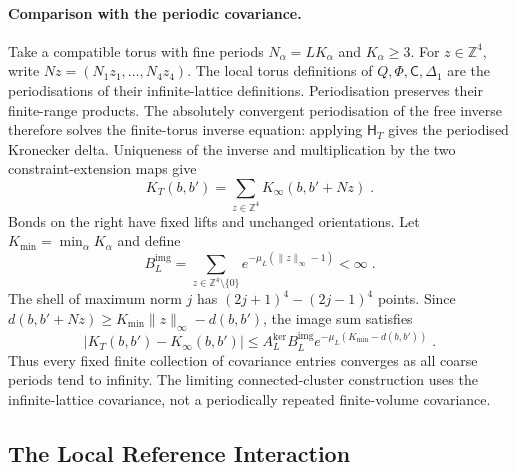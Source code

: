 \documentclass[11pt]{article}
\begin{document}
\paragraph{Comparison with the periodic covariance.}
Take a compatible torus with fine periods $N_\alpha=LK_\alpha$ and $K_\alpha\geq3$. For $z\in\mathbb Z^4$, write $Nz=(N_1z_1,\ldots,N_4z_4)$. The local torus definitions of $Q,\Phi,\mathsf C,\Delta_1$ are the periodisations of their infinite-lattice definitions. Periodisation preserves their finite-range products. The absolutely convergent periodisation of the free inverse therefore solves the finite-torus inverse equation: applying $\mathsf H_T$ gives the periodised Kronecker delta. Uniqueness of the inverse and multiplication by the two constraint-extension maps give
\begin{equation}\label{eq:bulk-periodisation}
    K_T(b,b')=\sum_{z\in\mathbb Z^4}K_\infty(b,b'+Nz)\;.
\end{equation}
Bonds on the right have fixed lifts and unchanged orientations. Let $K_{\min}=\min_\alpha K_\alpha$ and define
\begin{equation}\label{eq:bulk-image-constant}
    B_L^{\mathrm{img}}
        =\sum_{z\in\mathbb Z^4\setminus\{0\}}
            e^{-\mu_L(\|z\|_\infty-1)}<\infty\;.
\end{equation}
The shell of maximum norm $j$ has $(2j+1)^4-(2j-1)^4$ points. Since $d(b,b'+Nz)\geq K_{\min}\|z\|_\infty-d(b,b')$, the image sum satisfies
\begin{equation}\label{eq:bulk-image-error}
    |K_T(b,b')-K_\infty(b,b')|
        \leq A_L^{\mathrm{ker}}B_L^{\mathrm{img}}
            e^{-\mu_L(K_{\min}-d(b,b'))}\;.
\end{equation}
Thus every fixed finite collection of covariance entries converges as all coarse periods tend to infinity. The limiting connected-cluster construction uses the infinite-lattice covariance, not a periodically repeated finite-volume covariance.

\subsection{The Local Reference Interaction}
\label{sec:perimeter-attempt}
\end{document}
